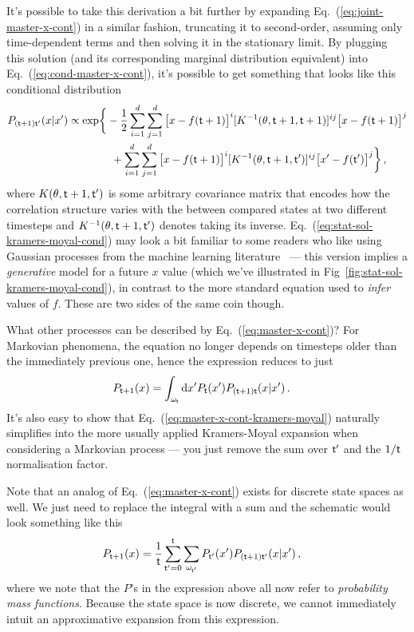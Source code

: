 \documentclass{book}
\begin{document}
It's possible to take this derivation a bit further by expanding Eq.~(\ref{eq:joint-master-x-cont}) in a similar fashion, truncating it to second-order, assuming only time-dependent terms and then solving it in the stationary limit. By plugging this solution (and its corresponding marginal distribution equivalent) into Eq.~(\ref{eq:cond-master-x-cont}), it's possible to get something that looks like this conditional distribution
\begin{align}
P_{({\sf t}+1){\sf t}'}(x\vert x') &\propto {\rm exp}\bigg\{ -\frac{1}{2}\sum^d_{i=1}\sum^d_{j=1}\big[ x-f({\sf t}+1)\big]^i [K^{-1}(\theta , {\sf t}+1,{\sf t}+1)]^{ij}\big[ x-f({\sf t}+1)\big]^j \nonumber \\
& \qquad \qquad + \sum^d_{i=1}\sum^d_{j=1}\big[ x-f({\sf t}+1)\big]^i [K^{-1}(\theta , {\sf t}+1,{\sf t}')]^{ij}\big[ x'-f({\sf t}')\big]^j  \bigg\} \label{eq:stat-sol-kramers-moyal-cond}\,,
\end{align}
where $K(\theta , {\sf t}+1,{\sf t}')$ is some arbitrary covariance matrix that encodes how the correlation structure varies with the between compared states at two different timesteps and $K^{-1}(\theta , {\sf t}+1,{\sf t}')$ denotes taking its inverse. Eq.~(\ref{eq:stat-sol-kramers-moyal-cond}) may look a bit familiar to some readers who like using Gaussian processes from the machine learning literature~\cite{murphy2012machine} --- this version implies a \emph{generative} model for a future $x$ value (which we've illustrated in Fig~\ref{fig:stat-sol-kramers-moyal-cond}), in contrast to the more standard equation used to \emph{infer} values of $f$. These are two sides of the same coin though.

What other processes can be described by Eq.~(\ref{eq:master-x-cont})? For Markovian phenomena, the equation no longer depends on timesteps older than the immediately previous one, hence the expression reduces to just
\begin{align}
P_{{\sf t}+1}(x) &= \int_{\omega_{\sf t}}{\rm d}x' P_{\sf t}(x') P_{({\sf t}+1){\sf t}}(x\vert x') \label{eq:master-x-cont-markov} \,.
\end{align}
It's also easy to show that Eq.~(\ref{eq:master-x-cont-kramers-moyal}) naturally simplifies into the more usually applied Kramers-Moyal expansion when considering a Markovian process --- you just remove the sum over ${\sf t}'$ and the $1/{\sf t}$ normalisation factor. 

Note that an analog of Eq.~(\ref{eq:master-x-cont}) exists for discrete state spaces as well. We just need to replace the integral with a sum and the schematic would look something like this
\begin{align}
P_{{\sf t}+1}(x) &= \frac{1}{{\sf t}}\sum_{{\sf t}'=0}^{\sf t}\sum_{\omega_{{\sf t}'}} P_{{\sf t}'}(x') P_{({\sf t}+1){\sf t}'}(x \vert x') \label{eq:master-x-disc} \,,
\end{align}
where we note that the $P$'s in the expression above all now refer to \emph{probability mass functions}. Because the state space is now discrete, we cannot immediately intuit an approximative expansion from this expression. 
\end{document}
